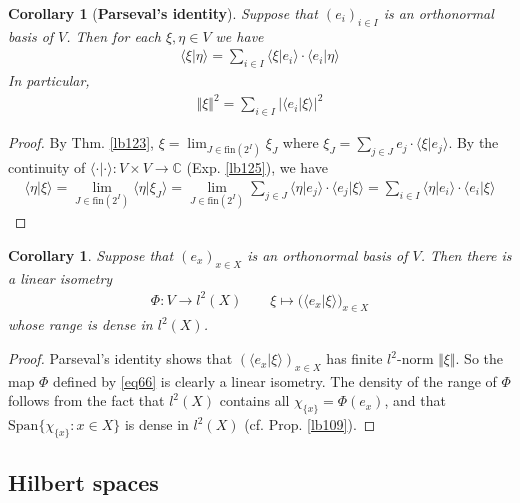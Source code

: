 \documentclass[12pt,b5paper,notitlepage]{article}
\theoremstyle{definition}
\theoremstyle{plain}
\newtheorem{co}[df]{Corollary}
\newcommand{\Span}{\mathrm{Span}}
\newcommand{\bk}[1]{\langle {#1}\rangle}
\newcommand{\Cbb}{\mathbb C}
\newcommand{\fin}{\mathrm{fin}}
\numberwithin{equation}{section}
\begin{document}
\begin{co}[\textbf{Parseval's identity}]\label{lb601}
Suppose that $(e_i)_{i\in I}$ is an orthonormal basis of $V$. Then for each $\xi,\eta\in V$ we have
\begin{align}
\bk{\xi|\eta}=\sum_{i\in I}\bk{\xi|e_i}\cdot\bk{e_i|\eta}
\end{align}
In particular,
\begin{align}
\Vert \xi\Vert^2=\sum_{i\in I}|\bk{e_i|\xi}|^2
\end{align}
\end{co}

\begin{proof}
By Thm. \ref{lb123}, $\xi=\lim_{J\in\fin(2^I)}\xi_J$ where $\xi_J=\sum_{j\in J}e_j\cdot\bk{\xi|e_j}$. By the continuity of $\bk{\cdot|\cdot}:V\times V\rightarrow\Cbb$ (Exp. \ref{lb125}), we have
\begin{align*}
\bk{\eta|\xi}=\lim_{J\in\fin(2^I)}\bk{\eta|\xi_J}=\lim_{J\in\fin(2^I)}\sum_{j\in J}\bk{\eta|e_j}\cdot\bk{e_j|\xi}=\sum_{i\in I}\bk{\eta|e_i}\cdot\bk{e_i|\xi}
\end{align*}
\end{proof}



\begin{co}\label{lb126}
Suppose that $(e_x)_{x\in X}$ is an orthonormal basis of $V$. Then there is a linear isometry
\begin{gather}\label{eq66}
\Phi:V\rightarrow l^2(X)\qquad \xi\mapsto \big(\bk{e_x|\xi})_{x\in X}
\end{gather} 
whose range is dense in $l^2(X)$.
\end{co}




\begin{proof}
Parseval's identity shows that $(\bk{e_x|\xi})_{x\in X}$ has finite $l^2$-norm $\Vert \xi\Vert$. So the map $\Phi$ defined by \eqref{eq66} is clearly a linear isometry. The density of the range of $\Phi$ follows from the fact that $l^2(X)$ contains all $\chi_{\{x\}}=\Phi(e_x)$, and that $\Span\{\chi_{\{x\}}:x\in X\}$ is dense in $l^2(X)$ (cf. Prop. \ref{lb109}).
\end{proof}




\subsection{Hilbert spaces}
\end{document}
